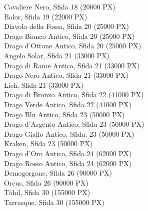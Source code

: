 \begin{multicols}{3}
{Cavaliere Nero, Sfida 18 (20000 PX)\\
Balor, Sfida 19 (22000 PX)\\
Diavolo della Fossa, Sfida 20 (25000 PX)\\
Drago Bianco Antico, Sfida 20 (25000 PX)\\
Drago d'Ottone Antico, Sfida 20 (25000 PX)\\
Angelo Solar, Sfida 21 (33000 PX)\\
Drago di Rame Antico, Sfida 21 (33000 PX)\\
Drago Nero Antico, Sfida 21 (33000 PX)\\
Lich, Sfida 21 (33000 PX)\\
Drago di Bronzo Antico, Sfida 22 (41000 PX)\\
Drago Verde Antico, Sfida 22 (41000 PX)\\
Drago Blu Antico, Sfida 23 (50000 PX)\\
Drago d'Argento Antico, Sfida 23 (50000 PX)\\
Drago Giallo Antico, Sfida: 23 (50000 PX)\\
Kraken, Sfida 23 (50000 PX)\\
Drago d'Oro Antico, Sfida 24 (62000 PX)\\
Drago Rosso Antico, Sfida 24 (62000 PX)\\
Demogorgone, Sfida 26 (90000 PX)\\
Orcus, Sfida 26 (90000 PX)\\
Tàhil, Sfida 30 (155000 PX)\\
Tarrasque, Sfida 30 (155000 PX)\\
}

\end{multicols}